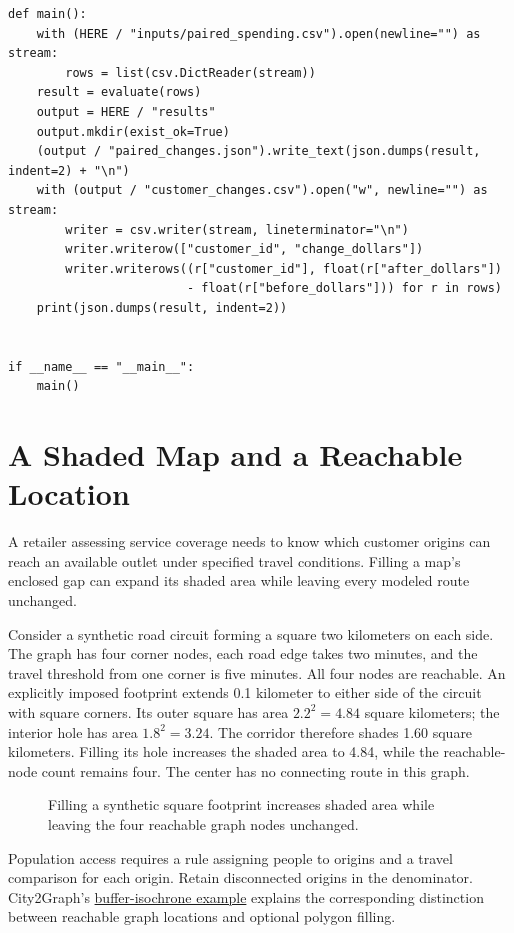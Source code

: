 \begin{Verbatim}[breaklines,breakanywhere,fontsize=\small]
def main():
    with (HERE / "inputs/paired_spending.csv").open(newline="") as stream:
        rows = list(csv.DictReader(stream))
    result = evaluate(rows)
    output = HERE / "results"
    output.mkdir(exist_ok=True)
    (output / "paired_changes.json").write_text(json.dumps(result, indent=2) + "\n")
    with (output / "customer_changes.csv").open("w", newline="") as stream:
        writer = csv.writer(stream, lineterminator="\n")
        writer.writerow(["customer_id", "change_dollars"])
        writer.writerows((r["customer_id"], float(r["after_dollars"])
                         - float(r["before_dollars"])) for r in rows)
    print(json.dumps(result, indent=2))


if __name__ == "__main__":
    main()
\end{Verbatim}

\hypertarget{M02-a-shaded-map-and-a-reachable-location}{%
\section{A Shaded Map and a Reachable
Location}\label{M02-a-shaded-map-and-a-reachable-location}}

\noindent \noindent A retailer assessing service coverage needs to know which
customer origins can reach an available outlet under specified travel
conditions. Filling a map's enclosed gap can expand its shaded area
while leaving every modeled route unchanged.

Consider a synthetic road circuit forming a square two kilometers on
each side. The graph has four corner nodes, each road edge takes two
minutes, and the travel threshold from one corner is five minutes. All
four nodes are reachable. An explicitly imposed footprint extends 0.1
kilometer to either side of the circuit with square corners. Its outer
square has area \(2.2^2=4.84\) square kilometers; the interior hole has
area \(1.8^2=3.24\). The corridor therefore shades 1.60 square
kilometers. Filling its hole increases the shaded area to 4.84, while
the reachable-node count remains four. The center has no connecting
route in this graph.

\begin{figure}[htbp]
\centering

\caption{Filling a synthetic square footprint increases shaded area while leaving the four reachable graph nodes unchanged.}\label{fig:M02_map_footprint}
\end{figure}

Population access requires a rule assigning people to origins and a
travel comparison for each origin. Retain disconnected origins in the
denominator. City2Graph's
\href{https://city2graph.net/latest/examples/isochrone_holes.html}{buffer-isochrone
example} explains the corresponding distinction between reachable graph
locations and optional polygon filling.

